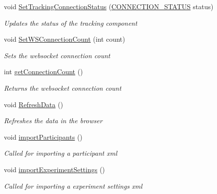 \begin{DoxyCompactItemize}
void \hyperlink{class_web_analyzer_1_1_u_i_1_1_interaction_objects_1_1_experiment_object_a2fb6e773317ff48802d4f5fda022005c}{Set\+Tracking\+Connection\+Status} (\hyperlink{class_web_analyzer_1_1_u_i_1_1_interaction_objects_1_1_experiment_object_a2875208b4f4b0ed643593152f4ec025c}{C\+O\+N\+N\+E\+C\+T\+I\+O\+N\+\_\+\+S\+T\+A\+T\+U\+S} status)
\begin{DoxyCompactList}\small\item\em Updates the status of the tracking component \end{DoxyCompactList}\item 
void \hyperlink{class_web_analyzer_1_1_u_i_1_1_interaction_objects_1_1_experiment_object_a4a6279a2c406c90ad9339cbf44a64d36}{Set\+W\+S\+Connection\+Count} (int count)
\begin{DoxyCompactList}\small\item\em Sets the websocket connection count \end{DoxyCompactList}\item 
int \hyperlink{class_web_analyzer_1_1_u_i_1_1_interaction_objects_1_1_experiment_object_aeb82fcd6bba971c2e08d59b236ee37c9}{get\+Connection\+Count} ()
\begin{DoxyCompactList}\small\item\em Returns the websocket connection count \end{DoxyCompactList}\item 
void \hyperlink{class_web_analyzer_1_1_u_i_1_1_interaction_objects_1_1_experiment_object_a11b8d543111e03266b1c22d601131376}{Refresh\+Data} ()
\begin{DoxyCompactList}\small\item\em Refreshes the data in the browser \end{DoxyCompactList}\item 
void \hyperlink{class_web_analyzer_1_1_u_i_1_1_interaction_objects_1_1_experiment_object_a193718a840220a11a4f4e0778813716d}{import\+Participants} ()
\begin{DoxyCompactList}\small\item\em Called for importing a participant xml \end{DoxyCompactList}\item 
void \hyperlink{class_web_analyzer_1_1_u_i_1_1_interaction_objects_1_1_experiment_object_aabec73f1883a94c250de42c66dffcba0}{import\+Experiment\+Settings} ()
\begin{DoxyCompactList}\small\item\em Called for importing a experiment settings xml \end{DoxyCompactList}\item 

\end{DoxyCompactItemize}
